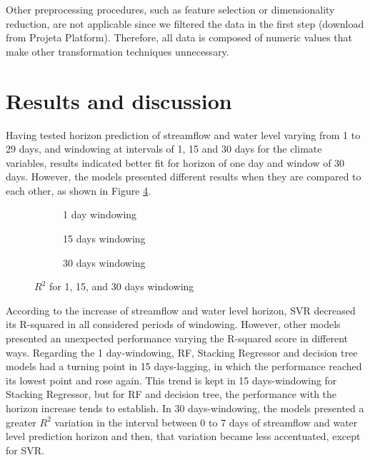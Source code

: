 \documentclass[12pt]{article}
\begin{document}
Other preprocessing procedures, such as feature selection or dimensionality reduction, are not applicable since we filtered the data in the first step (download from Projeta Platform). Therefore, all data is composed of numeric values that make other transformation techniques unnecessary.

\section{Results and discussion}

Having tested horizon prediction of streamflow and water level varying from 1 to 29 days, and windowing at intervals of 1, 15 and 30 days for the climate variables, results indicated better fit for horizon of one day and window of 30 days. However, the models presented different results when they are compared to each other, as shown in Figure \ref{fig:r2}.

\begin{figure}[htbp]
    \centering
    \begin{subfigure}[b]{.49\textwidth}
        \centering
        
        \caption{1 day windowing}
        \label{fig:r2_1}
    \end{subfigure}
    \begin{subfigure}[b]{.49\textwidth}
        \centering
        
        \caption{15 days windowing}
        \label{fig:r2_15}
    \end{subfigure}
    \begin{subfigure}[b]{\textwidth}
        \centering
        
        \captionsetup{justification=justified,singlelinecheck=false}
        \caption{30 days windowing}
        \label{fig:r2_30}
    \end{subfigure}
    \caption{\textbf{$R^2$} for  1,  15, and  30 days windowing}
    \label{fig:r2}
\end{figure}

According to the increase of streamflow  and water level horizon, SVR decreased its R-squared in all considered periods of windowing. However, other models presented an unexpected performance varying the R-squared score in different ways. Regarding the 1 day-windowing, RF, Stacking Regressor and decision tree models had a turning point in 15 days-lagging, in which the performance reached its lowest point and rose again. This trend is kept in 15 days-windowing for Stacking Regressor, but for RF and decision tree, the performance with the horizon increase tends to establish. In 30 days-windowing, the models presented a greater $R^2$ variation in the interval between 0 to 7 days of streamflow and water level prediction horizon
and then, that variation became less accentuated, except for SVR.
\end{document}
